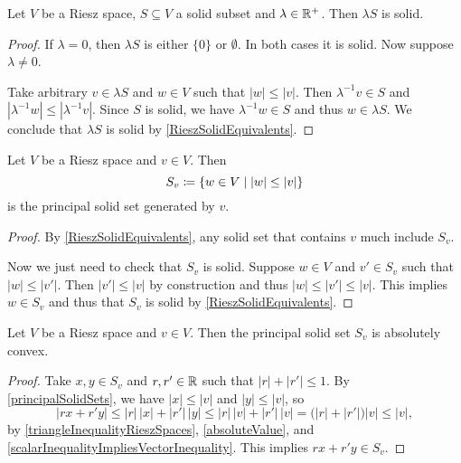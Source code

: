 \begin{lemma} \label{positiveMultipleSolid}
Let $V$ be a Riesz space, $S\subseteq V$ a solid subset and $\lambda \in \mathbb{R}^+$. Then $\lambda S$ is solid.
\end{lemma}
\begin{proof}
If $\lambda = 0$, then $\lambda S$ is either $\{0\}$ or $\emptyset$. In both cases it is solid. Now suppose $\lambda \neq 0$.

Take arbitrary $v\in \lambda S$ and $w\in V$ such that $|w|\leq |v|$. Then $\lambda^{-1}v \in S$ and $|\lambda^{-1}w| \leq |\lambda^{-1}v|$. Since $S$ is solid, we have $\lambda^{-1}w \in S$ and thus $w\in \lambda S$. We conclude that $\lambda S$ is solid by \ref{RieszSolidEquivalents}.
\end{proof}

\begin{proposition} \label{principalSolidSets}
Let $V$ be a Riesz space and $v\in V$. Then
\[ S_v \defeq \setbuilder{w\in V}{|w| \leq |v|} \]
is the principal solid set generated by $v$.
\end{proposition}
\begin{proof}
By \ref{RieszSolidEquivalents}, any solid set that contains $v$ much include $S_v$.

Now we just need to check that $S_v$ is solid. Suppose $w\in V$ and $v'\in S_v$ such that $|w| \leq |v'|$. Then $|v'| \leq |v|$ by construction and thus $|w| \leq |v'| \leq |v|$. This implies $w\in S_v$ and thus that $S_v$ is solid by \ref{RieszSolidEquivalents}.
\end{proof}

\begin{lemma} \label{principalSolidSetsAbsolutelyConvex}
Let $V$ be a Riesz space and $v\in V$. Then the principal solid set $S_v$ is absolutely convex.
\end{lemma}
\begin{proof}
Take $x,y\in S_v$ and $r,r'\in \mathbb{R}$ such that $|r|+|r'| \leq 1$. By \ref{principalSolidSets}, we have $|x|\leq |v|$ and $|y| \leq |v|$, so
\[ |rx + r'y| \leq |r|\,|x| + |r'|\,|y| \leq |r|\,|v| + |r'|\,|v| = \big(|r|+|r'|\big)|v| \leq |v|, \]
by \ref{triangleInequalityRieszSpaces}, \ref{absoluteValue}, and \ref{scalarInequalityImpliesVectorInequality}.
This implies $rx+r'y \in S_v$.
\end{proof}

